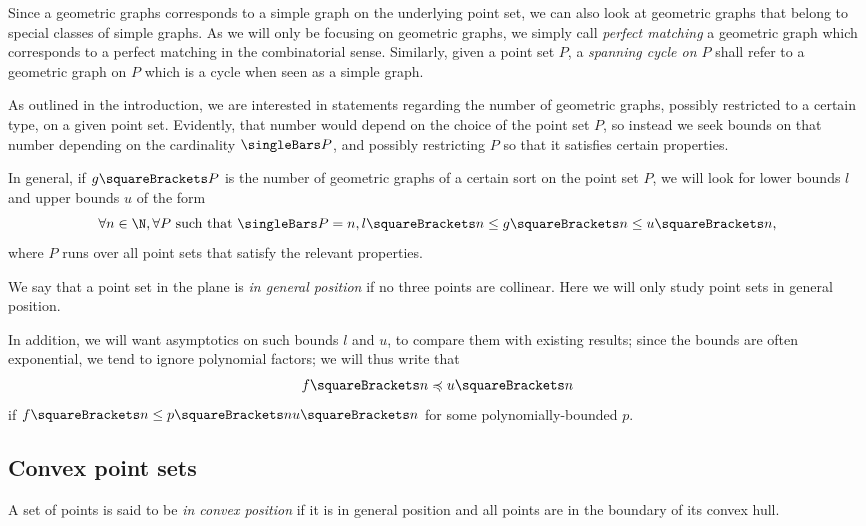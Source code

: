 \documentclass[10pt, a4paper, twoside]{basestyle}
\begin{document}
Since a geometric graphs corresponds to a simple graph on the underlying point set,
we can also look at geometric graphs that belong to special classes of simple graphs.
As we will only be focusing on geometric graphs, we simply call
\emph{perfect matching}
a geometric graph which corresponds to a perfect matching in the combinatorial sense.
Similarly, given a point set $P$, a \emph{spanning cycle on $P$} shall refer to a
geometric graph on $P$ which is a cycle when seen as a simple graph.

As outlined in the introduction, we are interested in statements regarding the number
of geometric graphs, possibly restricted to a certain type, on a given point set.
Evidently, that number would depend on the choice of the point set $P$, so instead we seek
bounds on that number depending on the cardinality $\Cardinality P$, and possibly
restricting $P$ so that it satisfies certain properties.

In general, if $g\of P$ is the number of geometric graphs of a certain sort on the point
set $P$, we will look for lower bounds $l$ and upper bounds $u$ of the form\[
\forall n\in \N, \forall P \text{ such that } \Cardinality P = n,
l \of n \leq g \of n \leq u \of n \text,\]
where $P$ runs over all point sets that satisfy the relevant properties.

We say that 
a point set in the plane is \emph{in general position} if no three points are collinear.
Here we will only study point sets in general position.

In addition, we will want asymptotics on such bounds $l$ and $u$, to compare them with
existing results; since the bounds are often exponential, we tend to ignore polynomial
factors; we will thus write that\[
f \of n \preccurlyeq u \of n
\]
if $f\of n \leq p\of n u \of n$ for some polynomially-bounded $p$.
\subsection{Convex point sets}
\label{ConvexPointSets}
A set of points is said to be \emph{in convex position} if it is in general position and
all points are in the boundary of its convex hull.
\end{document}
